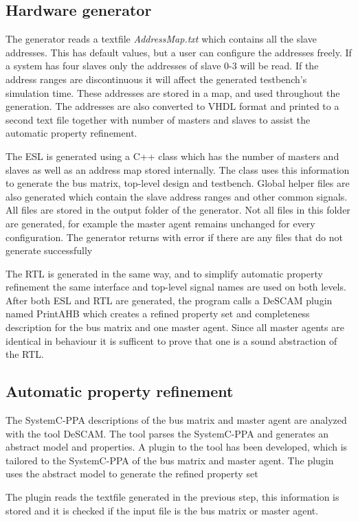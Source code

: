 \subsection{Hardware generator}
The generator reads a textfile \textit{AddressMap.txt} which contains all the slave addresses. This has default values, but a user can configure the addresses freely. If a system has four slaves only the addresses of slave 0-3 will be read. If the address ranges are discontinuous it will affect the generated testbench's simulation time. These addresses are stored in a map, and used throughout the generation. The addresses are also converted to VHDL format and printed to a second text file together with number of masters and slaves to assist the automatic property refinement. \par
The ESL is generated using a C++ class which has the number of masters and slaves as well as an address map stored internally. The class uses this information to generate the bus matrix, top-level design and testbench. Global helper files are also generated which contain the slave address ranges and other common signals. All files are stored in the output folder of the generator. Not all files in this folder are generated, for example the master agent remains unchanged for every configuration. The generator returns with error if there are any files that do not generate successfully \par
The RTL is generated in the same way, and to simplify automatic property refinement the same interface and top-level signal names are used on both levels.
After both ESL and RTL are generated, the program calls a DeSCAM plugin named PrintAHB which creates a refined property set and completeness description for the
bus matrix and one master agent. Since all master agents are identical in behaviour it is sufficent to prove that one is a sound abstraction of the RTL. 
   
\subsection{Automatic property refinement}
The SystemC-PPA descriptions of the bus matrix and master agent are analyzed with the tool DeSCAM. The tool parses the SystemC-PPA and generates an abstract
model and properties. A plugin to the tool has been developed, which is tailored to the SystemC-PPA of the bus matrix and master agent. The plugin uses the abstract model to generate the refined property set \par
The plugin reads the textfile generated in the previous step, this information is stored and it is checked if the input file is the bus matrix or master agent. 

